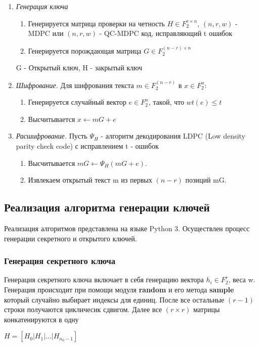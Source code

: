 \documentclass[12pt]{article}
\begin{document}
\begin{enumerate}
\item{\textit{Генерация ключа}}
\begin{enumerate}
    \item Генерируется матрица проверки на четность $H \in F^{r\times n}_{2}$, $(n,r,w)$ - MDPC или $(n,r,w)$ - QC-MDPC код, исправляющий t ошибок
    \item Генерируется порождающая матрица $G \in F_{2}^{(n-r)\times n}$
\end{enumerate}
G - Открытый ключ, H - закрытый ключ
\item{\textit{Шифрование.}} Для шифрования текста $m \in F^{(n-r)}_{2}$ в $x \in F^{n}_{2}$:
\begin{enumerate}
	\item Генерируется случайный вектор $e \in F_{2}^{n}$, такой, что $wt(e) \leq t$
	\item Высчитывается $x \longleftarrow mG + e$
\end{enumerate}
\item \textit{Расшифрование.} Пусть $\Psi_{H}$ - алгоритм декодирования LDPC (Low density parity check code) с исправлением t - ошибок  
\begin{enumerate}
	\item Высчитывается $mG \longleftarrow 
\Psi_{H}(mG+e)$.
	\item Извлекаем открытый текст m из первых $(n-r)$ позиций mG. 
\end{enumerate}
\end{enumerate}

\subsection{Реализация алгоритма генерации ключей}

Реализация алгоритмов представлена на языке Python 3. Осуществлен процесс генерации секретного и открытого ключей. 

\subsubsection{Генерация секретного ключа}

Генерация секретного ключа включает в себя генерацию вектора $h_{i} \in F_{2}^{r}$, веса w. Генерация происходит при помощи модуля \textbf{random} и его метода \textbf{sample} который случайно выбирает индексы для единиц. После все остальные $(r-1)$ строки получаются цикличесик сдвигом. Далее все $(r\times r)$ матрицы конкатенируются в одну 
\begin{center}
$H = [H_{0}|H_{1}| . . . |H_{n_{0}-1}]$
\end{center}
\end{document}
